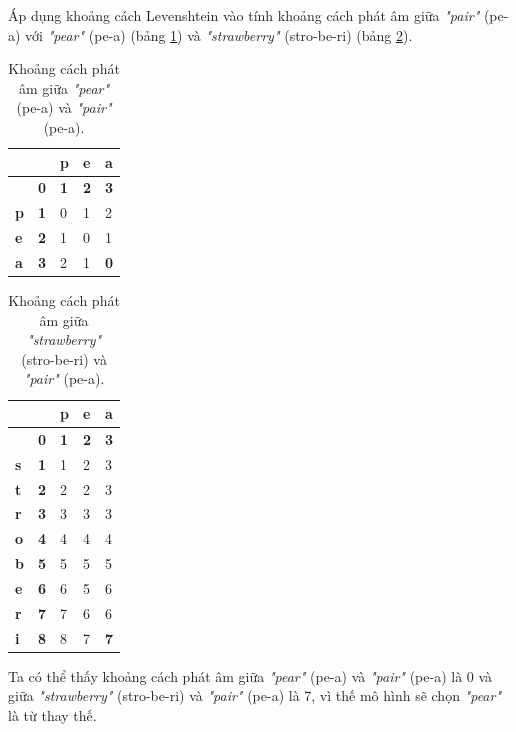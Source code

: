 Áp dụng khoảng cách Levenshtein vào tính khoảng cách phát âm giữa \textit{"pair"} (pe-a) với \textit{"pear"} (pe-a) (bảng \ref{Tab:pear-pair}) và \textit{"strawberry"} (stro-be-ri) (bảng \ref{Tab:strawberry-pair}).
\begin{table}[H]
\caption{Khoảng cách phát âm giữa \textit{"pear"} (pe-a) và \textit{"pair"} (pe-a).}
\centering
    \begin{tabular}{|l|l|l|l|l|}
    \hline
     & & \textbf{p} & \textbf{e} & \textbf{a} \\ \hline
     & \textbf{0} & \textbf{1} & \textbf{2} & \textbf{3} \\ \hline
    \textbf{p} & \textbf{1} & 0 & 1 & 2 \\ \hline
    \textbf{e} & \textbf{2} & 1 & 0 & 1 \\ \hline
    \textbf{a} & \textbf{3} & 2 & 1 & {\color[HTML]{FE0000} \textbf{0}} \\ \hline
    \end{tabular}
    \label{Tab:pear-pair}
\end{table}

\begin{table}[H]
\caption{Khoảng cách phát âm giữa \textit{"strawberry"} (stro-be-ri) và \textit{"pair"} (pe-a).}
\centering
    \begin{tabular}{|l|l|l|l|l|}
    \hline
     &  & \textbf{p} & \textbf{e} & \textbf{a} \\ \hline
     & \textbf{0} & \textbf{1} & \textbf{2} & \textbf{3} \\ \hline
    \textbf{s} & \textbf{1} & 1 & 2 & 3 \\ \hline
    \textbf{t} & \textbf{2} & 2 & 2 & 3 \\ \hline
    \textbf{r} & \textbf{3} & 3 & 3 & 3 \\ \hline
    \textbf{o} & \textbf{4} & 4 & 4 & 4 \\ \hline
    \textbf{b} & \textbf{5} & 5 & 5 & 5 \\ \hline
    \textbf{e} & \textbf{6} & 6 & 5 & 6 \\ \hline
    \textbf{r} & \textbf{7} & 7 & 6 & 6 \\ \hline
    \textbf{i} & \textbf{8} & 8 & 7 & {\color[HTML]{FE0000} \textbf{7}} \\ \hline
    \end{tabular}
    \label{Tab:strawberry-pair}
\end{table}

Ta có thể thấy khoảng cách phát âm giữa \textit{"pear"} (pe-a) và \textit{"pair"} (pe-a) là 0 và giữa \textit{"strawberry"} (stro-be-ri) và \textit{"pair"} (pe-a) là 7, vì thế mô hình sẽ chọn \textit{"pear"} là từ thay thế.

